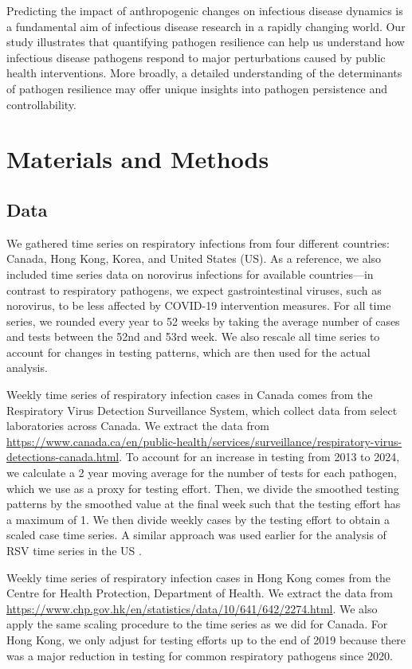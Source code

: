 \documentclass[12pt]{article}
\begin{document}
Predicting the impact of anthropogenic changes on infectious disease dynamics is a fundamental aim of infectious disease research in a rapidly changing world.
Our study illustrates that quantifying pathogen resilience can help us understand how infectious disease pathogens respond to major perturbations caused by public health interventions.
More broadly, a detailed understanding of the determinants of pathogen resilience may offer unique insights into pathogen persistence and controllability.

\section*{Materials and Methods}

\subsection*{Data}

We gathered time series on respiratory infections from four different countries: Canada, Hong Kong, Korea, and United States (US).
As a reference, we also included time series data on norovirus infections for available countries---in contrast to respiratory pathogens, we expect gastrointestinal viruses, such as norovirus, to be less affected by COVID-19 intervention measures.
For all time series, we rounded every year to 52 weeks by taking the average number of cases and tests between the 52nd and 53rd week.
We also rescale all time series to account for changes in testing patterns, which are then used for the actual analysis.

Weekly time series of respiratory infection cases in Canada comes from the Respiratory Virus Detection Surveillance System, which collect data from select laboratories across Canada.
We extract the data from \url{https://www.canada.ca/en/public-health/services/surveillance/respiratory-virus-detections-canada.html}.
To account for an increase in testing from 2013 to 2024, we calculate a 2 year moving average for the number of tests for each pathogen, which we use as a proxy for testing effort.
Then, we divide the smoothed testing patterns by the smoothed value at the final week such that the testing effort has a maximum of 1.
We then divide weekly cases by the testing effort to obtain a scaled case time series.
A similar approach was used earlier for the analysis of RSV time series in the US \citep{pitzer2015environmental}.

Weekly time series of respiratory infection cases in Hong Kong comes from the Centre for Health Protection, Department of Health. 
We extract the data from \url{https://www.chp.gov.hk/en/statistics/data/10/641/642/2274.html}.
We also apply the same scaling procedure to the time series as we did for Canada.
For Hong Kong, we only adjust for testing efforts up to the end of 2019 because there was a major reduction in testing for common respiratory pathogens since 2020.
\end{document}
